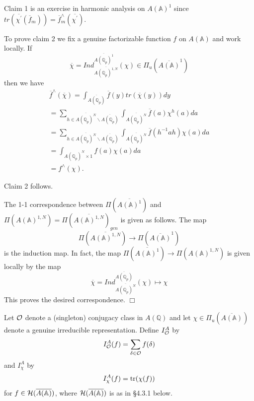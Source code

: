 Claim 1 is an exercise in harmonic analysis on $A({\mathbb{A}})^1$ since
$tr(\overline{\chi ^{\prime }}(\overline{f}_m))
=\overline{f}_m^{\wedge }(\overline{\chi ^{\prime }})$.

To prove claim 2 we fix a genuine factorizable function $f$ on $A({\mathbb{A}})$
and work locally. If 
\[
\overline{\chi }=
Ind_{\overline{A({\mathbb{Q}}_p)^{1,N}}}^{\overline{A({\mathbb{Q}}_p)^1}}
(\chi )\in \Pi_u (\overline{A({\mathbb{A}})}^1)
\]
then we have 
\begin{equation}
\begin{array}{c}
\overline{f}^{\wedge }(\overline{\chi })
=\int_{\overline{A({\mathbb{Q}}_p)}}
\overline{f}(y)tr(\overline{\chi }(y))dy \\ 
=\sum_{h\in \overline{A({\mathbb{Q}}_p)^N}
\backslash \overline{A({\mathbb{Q}}_p)}}
\int_{\overline{A({\mathbb{Q}}_p)^N}}
\overline{f}(a)\chi ^h(a)da \\ 
=\sum_{h\in \overline{A({\mathbb{Q}}_p)^N}
\backslash \overline{A({\mathbb{Q}}_p)}}
\int_{\overline{A({\mathbb{Q}}_p)^N}}
\overline{f}(h^{-1}ah)\chi (a)da \\ 
=\int_{A({\mathbb{Q}}_p)^N\times 1}
f(a)\chi (a)da \\ 
=f^{\wedge }(\chi ).
\end{array}
\end{equation}

Claim 2 follows.

The 1-1 correspondence between $\Pi (\overline{A({\mathbb{A}})^1})$ and
$\Pi (A({\mathbb{A}})^{1,N})=\Pi (\overline{A({\mathbb{A}})^{1,N}})_{gen}$
is given as follows. The map 
\[
\Pi (\overline{A({\mathbb{A}})^{1,N}})
\rightarrow \Pi (\overline{A({\mathbb{A}})}^1)
\]
is the induction map. In fact, the map
$\Pi (\overline{A({\mathbb{A}})^1})\rightarrow
\Pi (A({\mathbb{A}})^{1,N})$
is given locally by the map 
\[
\overline{\chi }
=Ind_{\overline{A({\mathbb{Q}}_p)^N}}^{\overline{A({\mathbb{Q}}_p)}}
(\chi )\longmapsto \chi 
\]
This proves the desired correspondence. $\Box $

Let ${\cal{O}}$ denote a (singleton) conjugacy
class in $A({\mathbb{Q}})$ and let
$\chi\in \Pi_u(\overline{A({\mathbb{A}})})$ denote a genuine irreducible
representation. Define $I^A_{\cal{O}}$ by
\begin{equation}
I^A_{\cal{O}}(f)=
\sum_{\delta\in {\cal{O}}}
f(\delta)
\end{equation}
and $I^A_{\chi}$ by
\begin{equation}
I^A_{\chi}(f)=
{\rm tr}(\chi(f)) 
\end{equation}
for $f\in {\cal{H}}(\overline{A({\mathbb{A}})})$, where
${\cal{H}}(\overline{A({\mathbb{A}})})$ is as in \S 4.3.1 below.


